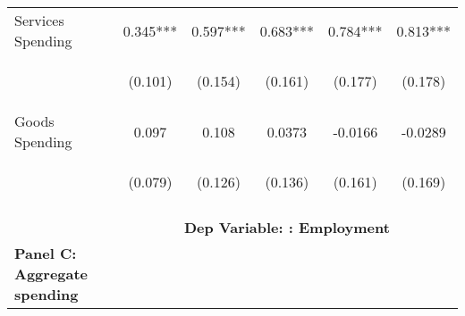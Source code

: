 \begin{tabular}{lccccc}
      
    Services Spending & 0.345*** & 0.597*** &         0.683*** &         0.784***   &       0.813*** \\
     & \begin{footnotesize}(0.101)\end{footnotesize} & \begin{footnotesize}(0.154)\end{footnotesize} & \begin{footnotesize}(0.161)\end{footnotesize} & \begin{footnotesize}(0.177)\end{footnotesize} & \begin{footnotesize}(0.178)\end{footnotesize} \\

    Goods Spending & 0.097 & 0.108 & 0.0373 & -0.0166 & -0.0289 \\
     & \begin{footnotesize}(0.079)\end{footnotesize} & \begin{footnotesize}(0.126)\end{footnotesize} & \begin{footnotesize}(0.136)\end{footnotesize} & \begin{footnotesize}(0.161)\end{footnotesize} & \begin{footnotesize}(0.169)\end{footnotesize} \\
    \hline
    \vspace{-2pt} & \vspace{-2pt} & \vspace{-2pt} & \vspace{-2pt} & \vspace{-2pt} \\
    & \multicolumn{5}{c}{\textbf{Dep Variable: : Employment}} \\ 
    \cmidrule{2-6}
    
   \multicolumn{1}{l}{\textbf{Panel C: Aggregate spending}} & & & & \\


\end{tabular}
